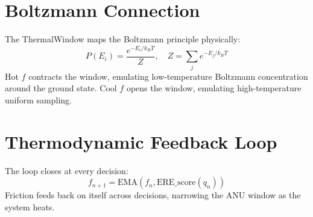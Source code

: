 \documentclass{article}
\begin{document}
\section{Boltzmann Connection}
The ThermalWindow maps the Boltzmann principle physically:
\begin{equation}
  P(E_i) = \frac{e^{-E_i / k_B T}}{Z}, \quad Z = \sum_j e^{-E_j / k_B T}
\end{equation}
Hot $f$ contracts the window, emulating low-temperature Boltzmann concentration around the ground state. Cool $f$ opens the window, emulating high-temperature uniform sampling.

\section{Thermodynamic Feedback Loop}
The loop closes at every decision:
\begin{equation}
  f_{n+1} = \mathrm{EMA}(f_n, \mathrm{ERE\_score}(q_n))
\end{equation}
Friction feeds back on itself across decisions, narrowing the ANU window as the system heats.
\end{document}

